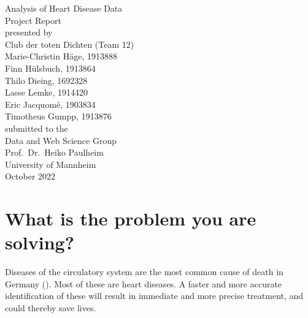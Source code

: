 \documentclass[11pt,titlepage,oneside,openany]{book}
\begin{document}
\begin{titlepage}
	\vspace*{2cm}
  \begin{center}
   {\Large Analysis of Heart Disease Data\\}
   \vspace{2cm} 
   {Project Report\\}
   \vspace{2cm}
   {presented by\\
   	Club der toten Dichten (Team 12)\\
    Marie-Christin Häge, 1913888 \\
    Finn Hülsbuch, 1913864 \\
    Thilo Dieing, 1692328 \\
    Lasse Lemke, 1914420 \\
    Eric Jacquomé, 1903834 \\
    Timotheus Gumpp, 1913876 \\
   }
   \vspace{1cm} 
   {submitted to the\\
    Data and Web Science Group\\
    Prof.\ Dr.\ Heiko Paulheim\\
    University of Mannheim\\} \vspace{2cm}
   {October 2022}
  \end{center}
\end{titlepage} 






\newpage





\section{What is the problem you are solving?}
\label{sec:problem}

Diseases of the circulatory system are the most common cause of death in Germany (\cite{statistischesbundesamt2022}).
Most of these are heart diseases. A faster and more accurate identification of these will result in immediate and more precise treatment, and could thereby save lives.
\end{document}
